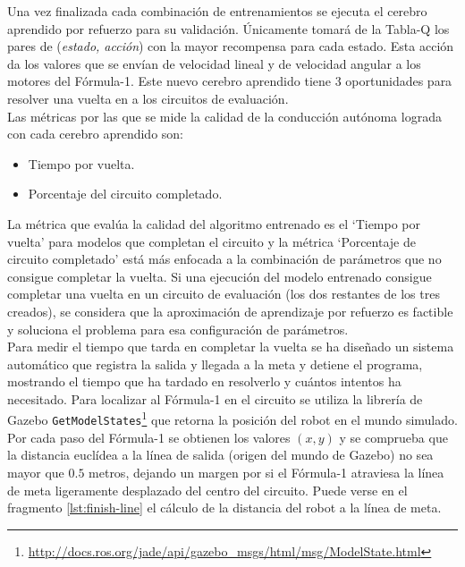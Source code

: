 Una vez finalizada cada combinación de entrenamientos se ejecuta el cerebro aprendido por refuerzo para su validación. Únicamente tomará de la Tabla-Q los pares de (\textit{estado, acción}) con la mayor recompensa para cada estado. Esta acción da los valores que se envían de velocidad lineal y de velocidad angular a los motores del Fórmula-1. Este nuevo cerebro aprendido tiene 3 oportunidades para resolver una vuelta en a los circuitos de evaluación.\\

Las métricas por las que se mide la calidad de la conducción autónoma lograda con cada cerebro aprendido son:\\

\begin{itemize}
    \item Tiempo por vuelta.
    \item Porcentaje del circuito completado.\\
\end{itemize}

La métrica que evalúa la calidad del algoritmo entrenado es el `Tiempo por vuelta' para modelos que completan el circuito y la métrica `Porcentaje de circuito completado' está más enfocada a la combinación de parámetros que no consigue completar la vuelta. Si una ejecución del modelo entrenado consigue completar una vuelta en un circuito de evaluación (los dos restantes de los tres creados), se considera que la aproximación de aprendizaje por refuerzo es factible y soluciona el problema para esa configuración de parámetros. \\

Para medir el tiempo que tarda en completar la vuelta se ha diseñado un sistema automático que registra la salida y llegada a la meta y detiene el programa, mostrando el tiempo que ha tardado en resolverlo y cuántos intentos ha necesitado. Para localizar al Fórmula-1 en el circuito se utiliza la librería de Gazebo \texttt{GetModelStates}\footnote{\url{http://docs.ros.org/jade/api/gazebo_msgs/html/msg/ModelState.html}} que retorna la posición del robot en el mundo simulado. Por cada paso del Fórmula-1 se obtienen los valores $(x, y)$ y se comprueba que la distancia euclídea a la línea de salida (origen del mundo de Gazebo) no sea mayor que $0.5$ metros, dejando un margen por si el Fórmula-1 atraviesa la línea de meta ligeramente desplazado del centro del circuito. Puede verse en el fragmento \ref{lst:finish-line} el cálculo de la distancia del robot a la línea de meta.

